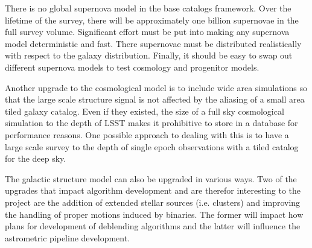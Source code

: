 \documentclass[11pt]{article}
\begin{document}
There is no global supernova model in the base catalogs framework.  Over the lifetime of the survey, there will be approximately one billion supernovae in the 
full survey volume.  Significant effort must be put into making any supernova model deterministic and fast.  There supernovae must be distributed realistically
with respect to the galaxy distribution.  Finally, it should be easy to swap out different supernova models to test cosmology and progenitor models.

Another upgrade to the cosmological model is to include wide area simulations so that the large scale structure signal is not affected by the aliasing of a small
area tiled galaxy catalog.  Even if they existed, the size of a full sky cosmological simulation to the depth of LSST makes it prohibitive to store in a 
database for performance reasons.  One possible approach to dealing with this is to have a large scale survey to the depth of single epoch observations with 
a tiled catalog for the deep sky.

The galactic structure model can also be upgraded in various ways.  Two of the upgrades that impact algorithm development and are therefor interesting to the project
are the addition of extended stellar sources (i.e. clusters) and improving the handling of proper motions induced by binaries.  The former will impact how plans for 
development of deblending algorithms and the latter will influence the astrometric pipeline development.

\end{document}
